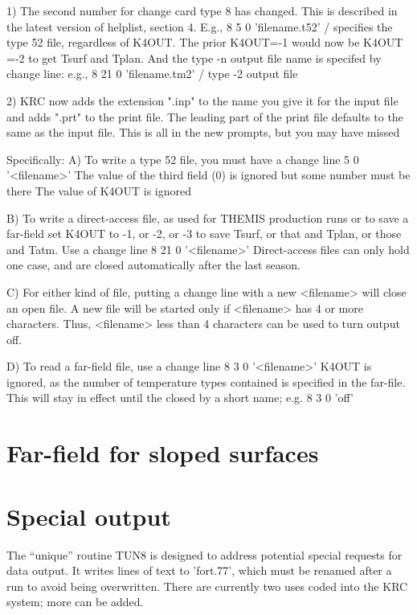 \documentclass{article}
\begin{document}
1) The second number for change card type 8 has changed. This is
   described in the latest version of helplist, section 4. E.g.,
   8 5 0 'filename.t52' / specifies the type 52 file, regardless of K4OUT.
   The prior K4OUT=-1  would now be K4OUT =-2 to get  Tsurf and Tplan.
   And the type -n output file name is specifed by change line: e.g.,
   8 21 0 'filename.tm2' / type -2 output file

2) KRC now adds the extension ".inp" to the name you give it for
  the input file and adds ".prt" to the print file.
  The leading part of the print file defaults to the same as the input file.
  This is all in the new prompts, but you may have missed 

Specifically:
A)  To write a type 52 file, you must have a change line
 5 0 '<filename>'
 \qi The value of the third field (0) is ignored but some number must be there
    The value of K4OUT is ignored

B) To write a direct-access file, as used for THEMIS production runs or to save a far-field
\qi set K4OUT to -1, or -2, or -3 to save Tsurf, or that and Tplan, or those and Tatm.
\qi Use a change line \hspace{1cm}      8 21 0 '<filename>'
\qi  Direct-access files can only hold one case, and are closed automatically after the last season.

C) For either kind of file, putting a change line with a new <filename>  will close an open file.
\qi     A new file will be started only if <filename> has 4 or more characters.
 \qi  Thus,  <filename> less than 4 characters can be used to turn output off.

D)  To read a far-field file, use a change line \hspace{1cm}  8  3 0 '<filename>'
\qi    K4OUT is ignored, as the number of temperature types contained is specified in the far-file.
\qi   This will stay in effect until the closed by a short name; e.g. \hspace{1cm}      8 3 0 'off'


\section{Far-field for sloped surfaces} 


\section{Special output \label{tun}}
The ``unique'' routine TUN8 is designed to address potential special requests
for data output. It writes lines of text to 'fort.77', which must be renamed
after a run to avoid being overwritten. There are currently two uses coded into
the KRC system; more can be added. 
\end{document}
